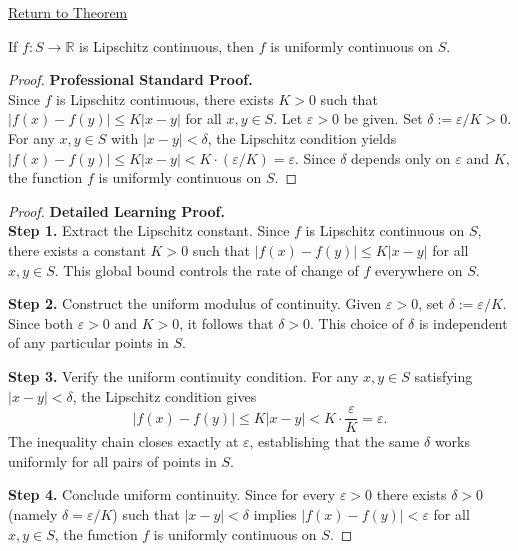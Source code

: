 \newpage
{}
\label{prf:lipschitz-implies-uniform-continuous}

\begin{remark*}[Return]
\hyperref[thm:lipschitz-implies-uniform-continuous]{Return to Theorem}
\end{remark*}

\begin{theorem*}
If $f \colon S \to \mathbb{R}$ is Lipschitz continuous, then $f$ is uniformly continuous on $S$.
\end{theorem*}

\begin{proof}
\textbf{Professional Standard Proof.}~\\
Since $f$ is Lipschitz continuous, there exists $K > 0$ such that $|f(x) - f(y)| \leq K|x - y|$ for all $x, y \in S$. Let $\varepsilon > 0$ be given. Set $\delta := \varepsilon / K > 0$. For any $x, y \in S$ with $|x - y| < \delta$, the Lipschitz condition yields $|f(x) - f(y)| \leq K|x - y| < K \cdot (\varepsilon/K) = \varepsilon$. Since $\delta$ depends only on $\varepsilon$ and $K$, the function $f$ is uniformly continuous on $S$.
\end{proof}

\begin{proof}
\textbf{Detailed Learning Proof.}~\\

\textbf{Step 1.} Extract the Lipschitz constant. Since $f$ is Lipschitz continuous on $S$, there exists a constant $K > 0$ such that $|f(x) - f(y)| \leq K|x - y|$ for all $x, y \in S$. This global bound controls the rate of change of $f$ everywhere on $S$.

\textbf{Step 2.} Construct the uniform modulus of continuity. Given $\varepsilon > 0$, set $\delta := \varepsilon / K$. Since both $\varepsilon > 0$ and $K > 0$, it follows that $\delta > 0$. This choice of $\delta$ is independent of any particular points in $S$.

\textbf{Step 3.} Verify the uniform continuity condition. For any $x, y \in S$ satisfying $|x - y| < \delta$, the Lipschitz condition gives
\[
|f(x) - f(y)| \leq K|x - y| < K \cdot \frac{\varepsilon}{K} = \varepsilon.
\]
The inequality chain closes exactly at $\varepsilon$, establishing that the same $\delta$ works uniformly for all pairs of points in $S$.

\textbf{Step 4.} Conclude uniform continuity. Since for every $\varepsilon > 0$ there exists $\delta > 0$ (namely $\delta = \varepsilon/K$) such that $|x - y| < \delta$ implies $|f(x) - f(y)| < \varepsilon$ for all $x, y \in S$, the function $f$ is uniformly continuous on $S$.
\end{proof}

